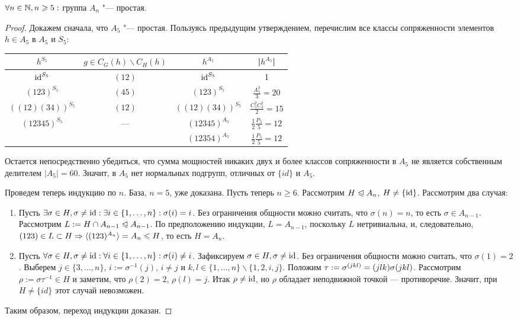 \begin{theorem}
	$\forall n \in \mathbb{N}, n \geqslant 5:$ группа $A_n$ "--- простая.
\end{theorem}

\begin{proof}
	Докажем сначала, что $A_5$ "--- простая. Пользуясь предыдущим утверждением, перечислим все классы сопряженности элементов $h \in A_5$ в $A_5$ и $S_5$:
	
	\def\arraystretch{1.5}
	\begin{center}
		\begin{tabular}{c|c|c|c}
			$h^{S_5}$ & $g \in C_G(h) \backslash C_H(h)$ & $h^{A_5}$ & |$h^{A_5}$| \\
			\hline
			$\operatorname{id}^{S_5}$ & $(12)$ & $\operatorname{id}^{S_5}$ & 1\\
			\hline
			$(123)^{S_5}$ & $(45)$ & $(123)^{S_5}$ & $\frac{A_5^3}3 = 20$\\
			\hline
			$((12)(34))^{S_5}$ & $(12)$ & $((12)(34))^{S_5}$ & $\frac{C_5^2C_3^2}2 = 15$ \\
			\hline
			\multirow{2}{*}{$(12345)^{S_5}$}& \multirow{2}{*}{---} & $(12345)^{A_5}$ & $\frac12\frac{P_5}{5} = 12$ \\
			\cline{3-4}
			&  & $(12354)^{A_5}$ & $\frac12\frac{P_5}{5} = 12$ \\
		\end{tabular}
	\end{center}
	\def\arraystretch{1}
	
	Остается непосредственно убедиться, что сумма мощностей никаких двух и более классов сопряженности в $A_5$ не является собственным делителем $|A_5| = 60$. Значит, в $A_5$ нет нормальных подгрупп, отличных от $\{id\}$ и $A_5$.
	
	Проведем теперь индукцию по $n$. База, $n = 5$, уже доказана. Пусть теперь $n \ge 6$. Рассмотрим $H \trianglelefteqslant A_n$, $H \ne \{\operatorname{id}\}$. Рассмотрим два случая:
	\begin{enumerate}
		\item Пусть $\exists \sigma \in H, \sigma \ne \operatorname{id}: \exists i \in \{1, \dotsc, n\}: \sigma(i) = i$. Без ограничения общности можно считать, что $\sigma(n) = n$, то есть $\sigma \in A_{n-1}$. Рассмотрим $L := H \cap A_{n - 1} \trianglelefteqslant A_{n - 1}$. По предположению индукции, $L = A_{n - 1}$, поскольку $L$ нетривиальна, и, следовательно, $(123) \in L \subset H \hm\ra \gl(123)^{A_n}\gr = A_n \le H$, то есть $H = A_n$.
		\item Пусть $\forall \sigma \in H, \sigma \ne \operatorname{id}: \forall i \in \{1, \dotsc, n\}: \sigma(i) \ne i$. Зафиксируем $\sigma \in H, \sigma \ne \operatorname{id}$. Без ограничения общности можно считать, что $\sigma(1) = 2$. Выберем $j \in \{3, \dotsc, n\}$, $i := \sigma^{-1}(j)$, $i \ne j$ и $k, l \in \{1, \dotsc, n\} \backslash \{1, 2, i, j\}$. Положим $\tau := \sigma^{(jkl)} \hm= (jlk)\sigma(jkl)$. Рассмотрим $\rho := \sigma\tau^{-1} \in H$ и заметим, что $\rho(2) = 2$, $\rho(l) = j$. Итак $\rho \ne \operatorname{id}$, но $\rho$ обладает неподвижной точкой --- противоречие. Значит, при $H \ne \{id\}$ этот случай невозможен.
	\end{enumerate}
	
	Таким образом, переход индукции доказан.
\end{proof}

